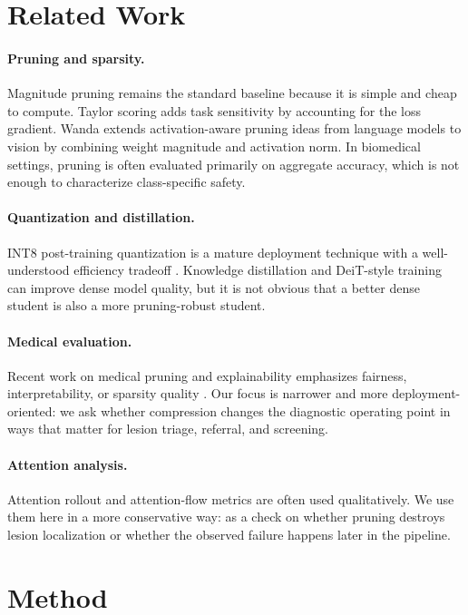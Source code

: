 \documentclass{article}
\begin{document}
\section{Related Work}
\paragraph{Pruning and sparsity.}
Magnitude pruning \cite{han2015deep} remains the standard baseline because it is simple and cheap to compute. Taylor scoring \cite{molchanov2017taylor} adds task sensitivity by accounting for the loss gradient. Wanda \cite{sun2023wanda} extends activation-aware pruning ideas from language models to vision by combining weight magnitude and activation norm. In biomedical settings, pruning is often evaluated primarily on aggregate accuracy, which is not enough to characterize class-specific safety.

\paragraph{Quantization and distillation.}
INT8 post-training quantization is a mature deployment technique with a well-understood efficiency tradeoff \cite{jacob2018quantization,gholami2021survey}. Knowledge distillation \cite{hinton2015distillation} and DeiT-style training \cite{touvron2021deit} can improve dense model quality, but it is not obvious that a better dense student is also a more pruning-robust student.

\paragraph{Medical evaluation.}
Recent work on medical pruning and explainability emphasizes fairness, interpretability, or sparsity quality \cite{paxton2025,yu2023xpruner}. Our focus is narrower and more deployment-oriented: we ask whether compression changes the diagnostic operating point in ways that matter for lesion triage, referral, and screening.

\paragraph{Attention analysis.}
Attention rollout and attention-flow metrics \cite{abnar2020attention} are often used qualitatively. We use them here in a more conservative way: as a check on whether pruning destroys lesion localization or whether the observed failure happens later in the pipeline.

\section{Method}
\end{document}
